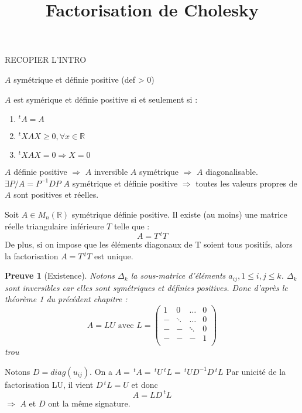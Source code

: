 \documentclass[a4paper,11pt]{article}
\title{\huge \bfseries Factorisation de Cholesky}
\date{}
\newcommand{\R}{\mathbb{R}}
\newcommand{\tpo}[1]{\,^t#1}
\theoremstyle{plain} %
\newtheorem{preuve}{Preuve}
\begin{document}
\maketitle

RECOPIER L'INTRO

$A$ symétrique et définie positive (def > 0)

\begin{remark}
    $A$ est symérique et définie positive si et seulement si :
    \begin{enumerate}
        \item $^tA = A$
        \item $^tXAX \geq 0, \forall x \in \R$
        \item $^tXAX = 0 \Rightarrow X = 0$
    \end{enumerate}

    $A$ définie positive $\Rightarrow$ $A$ inversible
    $A$ symétrique $\Rightarrow$ $A$ diagonalisable. $\exists P / A = P^{-1}DP$
    $A$ symétrique et définie positive $\Rightarrow$ toutes les valeurs propres de $A$ sont positives et réelles.
\end{remark}

\begin{ftheo}
    Soit $A \in M_n(\R)$ symétrique définie positive. Il existe (au moins) une matrice réelle triangulaire inférieure $T$ telle que :
    \[
        A = T \,^tT
    \]
    De plus, si on impose que les éléments diagonaux de T soient tous positifs, alors la factorisation $A = T \,^tT$ est unique.
\end{ftheo}


\begin{preuve}[Existence]
    Notons $\Delta_k$ la sous-matrice d'éléments $a_{ij}, 1 \leq i,j \leq k$.
    $\Delta_k$ sont inversibles car elles sont symétriques et définies positives.
    Donc d'après le théorème 1 du précédent chapitre :
    \[
        A = LU \text{ avec } L =
        \begin{pmatrix}
            1 & 0      & \dots  & 0 \\
            - & \ddots & \dots  & 0 \\
            - & -      & \ddots & 0 \\
            - & -      & -      & 1 \\
        \end{pmatrix}
    \]
    trou
\end{preuve}


Notons $D=diag(u_{ij})$. On a  $A=\tpo A = \tpo U \tpo L = \tpo U D^{-1} D \tpo L$
Par unicité de la factorisation LU, il vient $D \tpo L = U$ et donc 
\[
    A = L D \tpo L
\]
    $\Rightarrow$ $A$ et $D$ ont la même signature.
\end{document}
